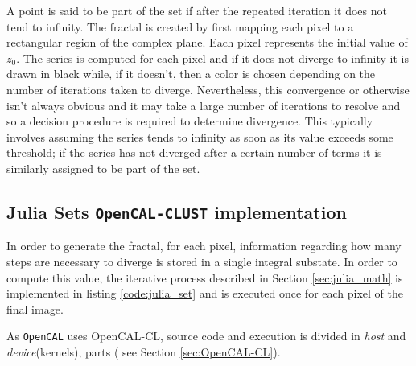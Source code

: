 A point is said to be part of the set if after the repeated iteration it does not tend to infinity.
The fractal is created by first mapping each pixel to a rectangular region of the complex plane. Each pixel represents the initial value of $z_0$. The series is computed for each pixel and if it does not diverge to infinity it is drawn in black while, if it doesn't, then a color is chosen depending on the number of iterations taken to diverge. Nevertheless, this convergence or otherwise isn't always obvious and it may take a large number of iterations to resolve and so a decision procedure is required to determine divergence. This typically involves assuming the series tends to infinity as soon as its value exceeds some threshold; if the series has not diverged after a certain number of terms it is similarly assigned to be part of the set. 

\subsection{Julia Sets \texttt{OpenCAL-CLUST}  implementation}
In order to generate the fractal, for each pixel, information regarding how many steps are necessary to diverge is stored in a single integral substate.
In order to compute this value, the iterative process described in Section \ref{sec:julia_math} is implemented in listing \ref{code:julia_set} and is executed once for each pixel of the final image.

As \texttt{OpenCAL} uses OpenCAL-CL, source code and execution is divided in \textit{host} and \textit{device}(kernels), parts ( see Section \ref{sec:OpenCAL-CL}).  

